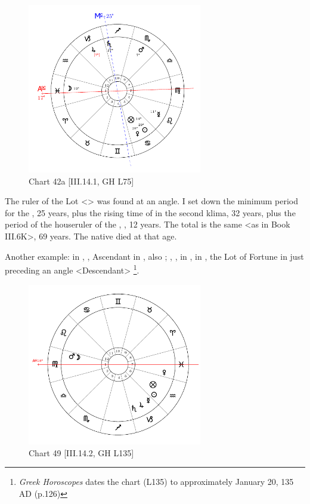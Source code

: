 \clearpage
\begin{figure}
\centering
\vspace{-20pt}
\includegraphics[width=0.68\textwidth]{charts/3_14_1}
\caption{Chart 42a [III.14.1, GH L75]}
\label{fig:chart42a}
\end{figure}  

The ruler of the Lot <\Moon> was found at an angle. I set down the minimum period for the \Moon, 25 years, plus the rising time of \Cancer\xspace in the second klima, 32 years, plus the period of the houseruler of the \Moon, \Jupiter, 12 years. The total is the same <as in Book III.6K>, 69
years. The native died at that age.

\newpage
Another example: \Sun\xspace in \Aquarius, \Moon, Ascendant in \Virgo, also \Mars; \Saturn, \Jupiter, \Mercury\xspace in \Capricorn, \Venus\xspace in \Pisces, the Lot of Fortune in \Aquarius\xspace just preceding an angle <Descendant>
\footnote{\textit{Greek Horoscopes} dates the chart (L135) to approximately January 20, 135 AD (p.126)}.

\clearpage
\begin{figure}
\centering
\vspace{-20pt}
\includegraphics[width=0.68\textwidth]{charts/3_14_2}
\caption{Chart 49 [III.14.2, GH L135]}
\label{fig:chart49}
\end{figure} 

